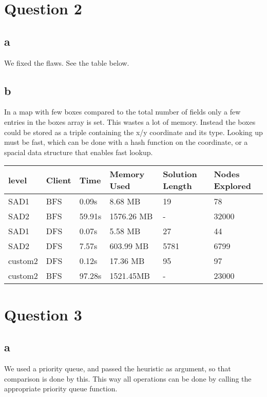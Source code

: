 \documentclass{article}
\begin{document}
\section{Question 2}
\subsection{a}
We fixed the flaws. See the table below.

\subsection{b}
In a map with few boxes compared to the total number of fields only a few entries in the boxes
array is set. This wastes a lot of memory. Instead the boxes could be stored as a triple containing
the x/y coordinate and its type. Looking up must be fast, which can be done with a hash function on
the coordinate, or a spacial data structure that enables fast lookup.\\

\begin{tabular}{l|l|l|l|l|l}
  level & Client & Time & Memory Used & Solution Length & Nodes Explored\\\hline
  SAD1 & BFS & 0.09s & 8.68 MB & 19 & 78\\
  SAD2 & BFS & 59.91s & 1576.26 MB  & - & 32000\\
  SAD1 & DFS & 0.07s & 5.58 MB & 27 & 44\\
  SAD2 & DFS & 7.57s & 603.99 MB & 5781 & 6799\\
  custom2 & DFS & 0.12s & 17.36 MB & 95 & 97\\
  custom2 & BFS & 97.28s & 1521.45MB & - & 23000\\
\end{tabular}

\section{Question 3}
\subsection{a}
We used a priority queue, and passed the heuristic as argument, so that comparison is done by this. This way all operations can be done by calling the appropriate priority queue function.
\end{document}
